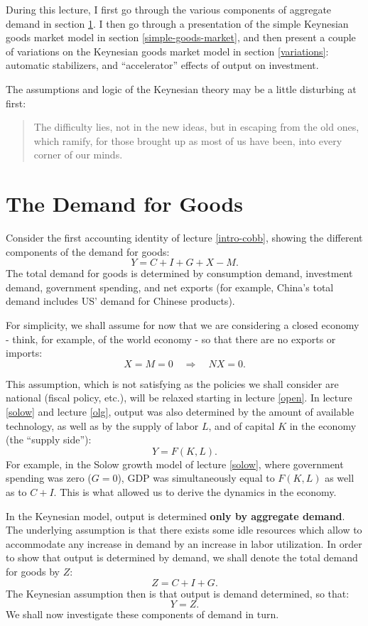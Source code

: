\documentclass[]{book}
\theoremstyle{definition}
\theoremstyle{definition}
\theoremstyle{definition}
\theoremstyle{remark}
\begin{document}
During this lecture, I first go through the various components of
aggregate demand in section \ref{cons-function-demand-for-goods}. I then
go through a presentation of the simple Keynesian goods market model in
section \ref{simple-goods-market}, and then present a couple of
variations on the Keynesian goods market model in section
\ref{variations}: automatic stabilizers, and ``accelerator'' effects of
output on investment.

The assumptions and logic of the Keynesian theory may be a little
disturbing at first:

\begin{quote}
The difficulty lies, not in the new ideas, but in escaping from the old
ones, which ramify, for those brought up as most of us have been, into
every corner of our minds.
\end{quote}

\section{The Demand for Goods}\label{cons-function-demand-for-goods}

Consider the first accounting identity of lecture \ref{intro-cobb},
showing the different components of the demand for goods:
\[Y=C+I+G+X-M.\] The total demand for goods is determined by consumption
demand, investment demand, government spending, and net exports (for
example, China's total demand includes US' demand for Chinese products).

For simplicity, we shall assume for now that we are considering a closed
economy - think, for example, of the world economy - so that there are
no exports or imports: \[X=M=0 \quad \Rightarrow \quad NX=0.\]

This assumption, which is not satisfying as the policies we shall
consider are national (fiscal policy, etc.), will be relaxed starting in
lecture \ref{open}. In lecture \ref{solow} and lecture \ref{olg}, output
was also determined by the amount of available technology, as well as by
the supply of labor \(L\), and of capital \(K\) in the economy (the
``supply side''): \[Y=F\left(K, L\right).\] For example, in the Solow
growth model of lecture \ref{solow}, where government spending was zero
(\(G=0\)), GDP was simultaneously equal to \(F(K,L)\) as well as to
\(C+I\). This is what allowed us to derive the dynamics in the economy.

In the Keynesian model, output is determined \textbf{only by aggregate
demand}. The underlying assumption is that there exists some idle
resources which allow to accommodate any increase in demand by an
increase in labor utilization. In order to show that output is
determined by demand, we shall denote the total demand for goods by
\(Z\): \[Z=C+I+G.\] The Keynesian assumption then is that output is
demand determined, so that: \[Y=Z.\] We shall now investigate these
components of demand in turn.
\end{document}
